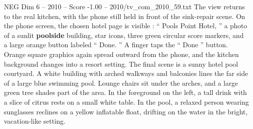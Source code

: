 \begin{textsample}{NEG Dim 6 – 2010 – Score -1.00 – 2010/tv\_com\_2010\_59.txt}
The view returns to the real kitchen, with the phone still held in front of the sink-repair scene.
On the phone screen, the chosen hotel page is visible : “ Pools Point Hotel, ” a photo of a sunlit \textbf{poolside} building, star icons, three green circular score markers, and a large orange button labeled “ Done. ” A finger taps the “ Done ” button.
Orange square graphics again spread outward from the phone, and the kitchen background changes into a resort setting.
The final scene is a sunny hotel pool courtyard.
A white building with arched walkways and balconies lines the far side of a large blue swimming pool.
Lounge chairs sit under the arches, and a large green tree shades part of the area.
In the foreground on the left, a tall drink with a slice of citrus rests on a small white table.
In the pool, a relaxed person wearing sunglasses reclines on a yellow inflatable float, drifting on the water in the bright, vacation-like setting.

\end{textsample}
